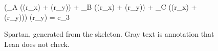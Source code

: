 \begin{figure}
{
 \< \<  (\rho_{A} \cdot {}((r_{x}) + (r_{y})) + \rho_{B} \cdot {}((r_{x}) + (r_{y})) + \rho_{C} \cdot {}((r_{x}) + (r_{y}))) \cdot {}(r_{y}) = c_{3}
}
\caption{Spartan, generated from the skeleton. Gray text is annotation that Lean does not check.}
\end{figure}
